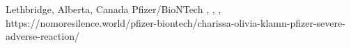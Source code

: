           {Lethbridge, Alberta, Canada}
          {}
          {Pfizer/BioNTech}
          {}
          {
            ,
            ,
            ,
          }
          {https://nomoresilence.world/pfizer-biontech/charissa-olivia-klamn-pfizer-severe-adverse-reaction/}



